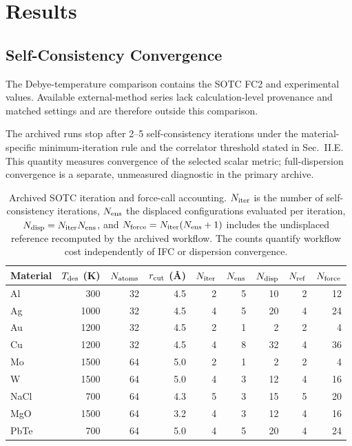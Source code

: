 \documentclass[aps,prb,reprint,amsmath,amssymb,floatfix]{revtex4-2}
\begin{document}
\section{Results}\label{results}

\subsection{Self-Consistency
Convergence}\label{self-consistency-convergence}

\color{revisionblue}
The Debye-temperature comparison contains the SOTC FC2 and experimental values.
Available external-method series lack calculation-level provenance and matched
settings and are therefore outside this comparison.
\color{black}

\color{revisionblue}
The archived runs stop after 2--5 self-consistency iterations under the
material-specific minimum-iteration rule and the correlator threshold stated in
Sec.~II.E. This quantity measures convergence of the selected scalar metric;
full-dispersion convergence is a separate, unmeasured diagnostic in the primary
archive.
\color{black}

\color{revisionblue}
\begin{table}[htbp]
\color{black}

\color{revisionblue}
\caption{Archived SOTC iteration and force-call accounting.
\(N_{\rm iter}\) is the number of self-consistency iterations,
\(N_{\rm ens}\) the displaced configurations evaluated per iteration,
\(N_{\rm disp}=N_{\rm iter}N_{\rm ens}\), and
\(N_{\rm force}=N_{\rm iter}(N_{\rm ens}+1)\) includes the undisplaced
reference recomputed by the archived workflow. The counts quantify workflow
cost independently of IFC or dispersion convergence.}
\begin{ruledtabular}
\begin{tabular}{lrrrrrrrr}
Material & \(T_{\rm des}\) (K) & \(N_{\rm atoms}\) & \(r_{\rm cut}\) (Å) &
\(N_{\rm iter}\) & \(N_{\rm ens}\) & \(N_{\rm disp}\) &
\(N_{\rm ref}\) & \(N_{\rm force}\) \\
\hline
Al   & 300  & 32 & 4.5 & 2 & 5 & 10 & 2 & 12 \\
Ag   & 1000 & 32 & 4.5 & 4 & 5 & 20 & 4 & 24 \\
Au   & 1200 & 32 & 4.5 & 2 & 1 &  2 & 2 &  4 \\
Cu   & 1200 & 32 & 4.5 & 4 & 8 & 32 & 4 & 36 \\
Mo   & 1500 & 64 & 5.0 & 2 & 1 &  2 & 2 &  4 \\
W    & 1500 & 64 & 5.0 & 4 & 3 & 12 & 4 & 16 \\
NaCl & 700  & 64 & 4.3 & 5 & 3 & 15 & 5 & 20 \\
MgO  & 1500 & 64 & 3.2 & 4 & 3 & 12 & 4 & 16 \\
PbTe & 700  & 64 & 5.0 & 4 & 5 & 20 & 4 & 24 \\
\end{tabular}
\end{ruledtabular}
\label{tab:1}
\color{black}

\color{revisionblue}
\end{table}
\color{black}
\end{document}
